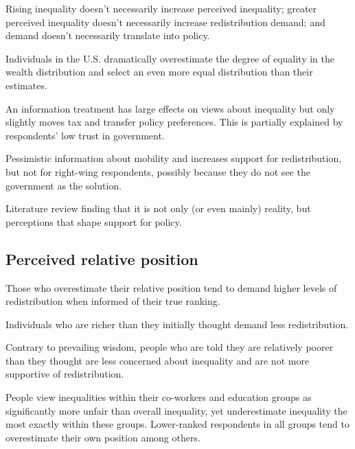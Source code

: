 \documentclass{article}
\newcommand{\citem}[1]{\medskip \noindent \textbf{\cite*{#1}}}
\begin{document}
Rising inequality doesn't necessarily increase perceived inequality; greater perceived inequality doesn't necessarily increase redistribution demand; and demand doesn't necessarily translate into policy.

\citem{norton2011building}

Individuals in the U.S. dramatically overestimate the degree of equality in the wealth distribution and select an even more equal distribution than their estimates.

\citem{kuziemko2015elastic} 

An information treatment has large effects on views about inequality but only slightly moves tax and transfer policy preferences. This is partially explained by respondents’ low trust in government.

\citem{alesina2018intergenerational}

Pessimistic information about mobility and increases support for redistribution, but not for  right-wing respondents, possibly because they do not see the government as the solution.

\citem{stantcheva2021perceptions}

Literature review finding that it is not only (or even mainly) reality, but perceptions that shape support for policy. 

\subsection{Perceived relative position}

\citem{cruces2013biased}

Those who overestimate their relative position tend to demand higher levels of redistribution when informed of their true ranking.

\citem{karadja2017richer}

Individuals who are richer than they initially thought demand less redistribution.

\citem{hoy2021relatively}

Contrary to prevailing wisdom, people who are told they are relatively poorer than they thought are less concerned about inequality and are not more supportive of redistribution. 

\citem{hvidberg2023social}

People view inequalities within their co-workers and education groups as significantly more unfair than overall inequality, yet underestimate inequality the most exactly within these groups. Lower-ranked respondents in all groups tend to overestimate their own position among others.
\end{document}
